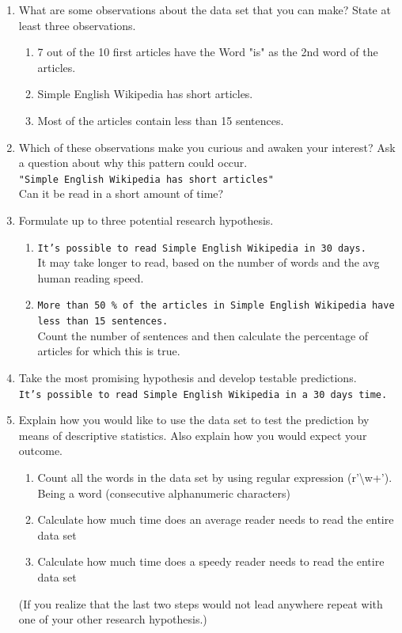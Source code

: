 \documentclass{WeSTassignment}
\begin{document}
\begin{enumerate}
\item What are some observations about the data set that you can make? State at least three observations.
\begin{enumerate}
\item 7 out of the 10 first articles have the Word "is" as the 2nd word of the articles.
\item Simple English Wikipedia has short articles.
\item Most of the articles contain less than 15 sentences.
\end{enumerate}
\item Which of these observations make you curious and awaken your interest? Ask a question about why this pattern could occur.
\\ \texttt{"Simple English Wikipedia has short articles"}
\\ Can it be read in a short amount of time?
\item Formulate up to three potential research hypothesis.
\begin{enumerate}
\item \texttt{It's possible to read Simple English Wikipedia in 30 days.}
\\ It may take longer to read, based on the number of words and the avg human reading speed.
\item \texttt{More than 50 \% of the articles in Simple English Wikipedia have less than 15 sentences.}
\\Count the number of sentences and then calculate the percentage of articles for which this is true.
\end{enumerate}

\item Take the most promising hypothesis and develop testable predictions.
\\ \texttt{It's possible to read Simple English Wikipedia in a 30 days time.}

\item Explain how you would like to use the data set to test the prediction by means of descriptive statistics. Also explain how you would expect your outcome. 
\begin{enumerate}
\item Count all the words in the data set by using regular expression (r'\textbackslash w+'). Being a word (consecutive alphanumeric characters)
\item Calculate how much time does an average reader needs to read the entire data set
\item Calculate how much time does a speedy reader needs to read the entire data set
\end{enumerate}

(If you realize that the last two steps would not lead anywhere repeat with one of your other research hypothesis.)
\end{enumerate}
\end{document}
